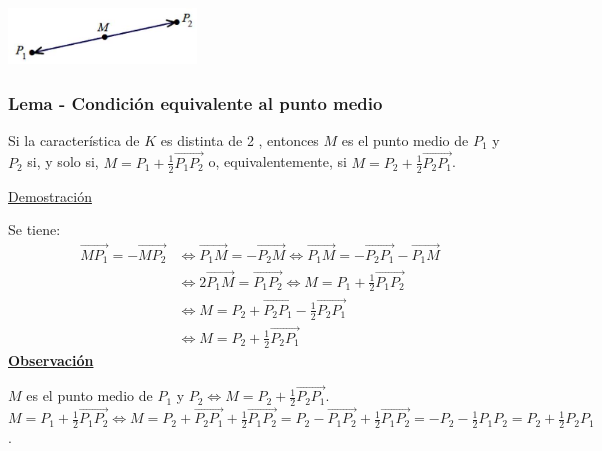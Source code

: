 \documentclass[12pt, a4paper, ones, notitlepage, openany,titlepage]{article}
\newcommand{\demostracion}{\noindent\underline{Demostración}}
\newcommand{\observacion}{\noindent\underline{\textbf{Observación}}}
\begin{document}
\begin{center}
\includegraphics[max width=5cm]{2023_03_01_7659aec5e35f9a9b2d3cg-12}
\end{center}

\subsubsection{Lema - Condición equivalente al punto medio}
Si la característica de $K$ es distinta de 2 , entonces $M$ es el punto medio de $P_{1}$ y $P_{2}$ si, y solo si, $M=P_{1}+\frac{1}{2} \overrightarrow{P_{1} P_{2}}$ o, equivalentemente, si $M=P_{2}+\frac{1}{2} \overrightarrow{P_{2} P_{1}}$.

\demostracion

\noindent Se tiene:
$$
\begin{aligned}
\overrightarrow{M P_{1}}=-\overrightarrow{M P_{2}} & \Longleftrightarrow \overrightarrow{P_{1} M}=-\overrightarrow{P_{2} M} \Longleftrightarrow \overrightarrow{P_{1} M}=-\overrightarrow{P_{2} P_{1}}-\overrightarrow{P_{1} M} \\
& \Longleftrightarrow 2 \overrightarrow{P_{1} M}=\overrightarrow{P_{1} P_{2}} \Longleftrightarrow M=P_{1}+\frac{1}{2} \overrightarrow{P_{1} P_{2}} \\
& \Longleftrightarrow M=P_{2}+\overrightarrow{P_{2} P_{1}}-\frac{1}{2} \overrightarrow{P_{2} P_{1}} \\
& \Longleftrightarrow M=P_{2}+\frac{1}{2} \overrightarrow{P_{2} P_{1}}
\end{aligned}
$$
\observacion

$M$ es el punto medio de $P_1$ y $P_2 \Longleftrightarrow M = P_2 + \frac{1}{2} \overrightarrow{P_2 P_1}$. $M = P_1 + \frac{1}{2} \overrightarrow{P_1 P_2} \Longleftrightarrow M = P_2 + \overrightarrow{P_2 P_1} + \frac{1}{2} \overrightarrow{P_1 P_2} = P_2 - \overrightarrow{P_1 P_2} + \frac{1}{2} \overrightarrow{P_1 P_2} = -P_2 - \frac{1}{2} P_1 P_2 = P_2 + \frac{1}{2} P_2 P_1$.
\end{document}
